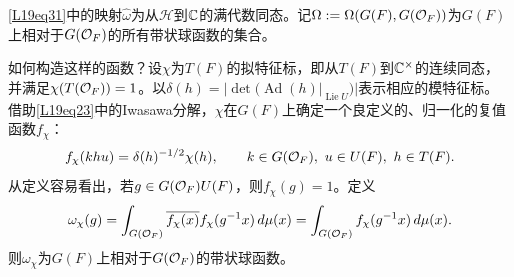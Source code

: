 \eqref{L19eq31}中的映射$\widehat\omega$为从$\mathcal H$到$\mathbb{C}$的满代数同态。记$\Omega:=\Omega(G(F),G(\mathcal O_F))$为$G(F)$上相对于$G(\mathcal O_F)$的所有带状球函数的集合。

如何构造这样的函数？设$\chi$为$T(F)$的拟特征标，即从$T(F)$到$\mathbb{C}^\times$的连续同态，并满足$\chi(T(\mathcal O_F))=1$。以$\delta(h)=|\det(\operatorname{Ad}(h)|_{\operatorname{Lie}U})|$表示相应的模特征标。借助\eqref{L19eq23}中的Iwasawa分解，$\chi$在$G(F)$上确定一个良定义的、归一化的复值函数$f_\chi$：
\[f_\chi(khu)=\delta(h)^{-1/2}\chi(h),\qquad k\in G(\mathcal O_F),\ u\in U(F),\ h\in T(F).\]
从定义容易看出，若$g\in G(\mathcal O_F)U(F)$，则$f_\chi(g)=1$。定义
\[\omega_\chi(g)=\int_{G(\mathcal O_F)}\overline{f_\chi(x)}f_\chi(g^{-1}x)\,d\mu(x)=\int_{G(\mathcal O_F)}f_\chi(g^{-1}x)\,d\mu(x).\]
则$\omega_\chi$为$G(F)$上相对于$G(\mathcal O_F)$的带状球函数。

